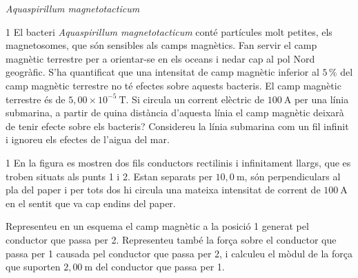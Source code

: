 {\centering \textit{Aquaspirillum magnetotacticum}\par}

\begin{apartat}{1}
El bacteri \textit{Aquaspirillum magnetotacticum} conté partícules molt petites, els magnetosomes, que són sensibles als camps magnètics. Fan servir el camp magnètic terrestre per a orientar-se en els oceans i nedar cap al pol Nord geogràfic. S'ha quantificat que una intensitat de camp magnètic inferior al $5\,\%$ del camp magnètic terrestre no té efectes sobre aquests bacteris. El camp magnètic terrestre és de $5,00\times 10^{-5}\ \mathrm{T}$. Si circula un corrent elèctric de $100\ \mathrm{A}$ per una línia submarina, a partir de quina distància d'aquesta línia el camp magnètic deixarà de tenir efecte sobre els bacteris? Considereu la línia submarina com un fil infinit i ignoreu els efectes de l'aigua del mar.
\end{apartat}

\begin{apartat}{1}
En la figura es mostren dos fils conductors rectilinis i infinitament llargs, que es troben situats als punts 1 i 2. Estan separats per $10,0\ \mathrm{m}$, són perpendiculars al pla del paper i per tots dos hi circula una mateixa intensitat de corrent de $100\ \mathrm{A}$ en el sentit que va cap endins del paper.


Representeu en un esquema el camp magnètic a la posició 1 generat pel conductor que passa per 2. Representeu també la força sobre el conductor que passa per 1 causada pel conductor que passa per 2, i calculeu el mòdul de la força que suporten $2,00\ \mathrm{m}$ del conductor que passa per 1.
\end{apartat}

